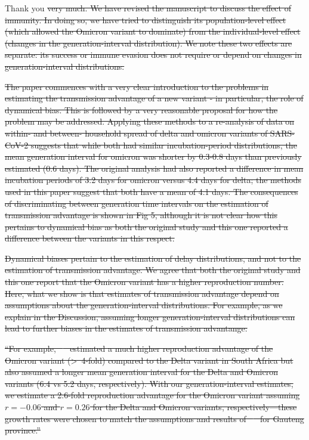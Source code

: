 \documentclass[12pt]{article}
\newcommand{\rev}{\subsection*}
\newcommand{\revtext}{\textsf}
\providecommand{\DIFdeltex}[1]{{\protect\color{red}\sout{#1}}}                      %
\providecommand{\DIFdelbegin}{} %
\providecommand{\DIFdel}[1]{\texorpdfstring{\DIFdeltex{#1}}{}} %
\begin{document}
Thank you \DIFdelbegin \DIFdel{very much. We have revised the manuscript to discuss the effect of immunity. In doing so, we have tried to distinguish its population-level effect (which allowed the Omicron variant to dominate) from the individual-level effect (changes in the generation-interval distribution).
We note these two effects are separate: its success or immune evasion does not require or depend on changes in generation-interval distributions.
}%


\DIFdel{\revtext{The paper commences with a very clear introduction to the problems in estimating the transmission advantage of a new variant - in particular, the role of dynamical bias. This is followed by a very reasonable proposal for how the problem may be addressed. Applying these methods to a re-analysis of data on within- and between- household spread of delta and omicron variants of SARS-CoV-2 suggests that while both had similar incubation-period distributions, the mean generation interval for omicron was shorter by 0.3-0.8 days than previously estimated (0.6 days). The original analysis had also reported a difference in mean incubation periods of 3.2 days for omicron versus 4.4 days for delta; the methods used in this paper suggest that both have a mean of 4.1 days. The consequences of discriminating between generation time intervals on the estimation of transmission advantage is shown in Fig 5, although it is not clear how this pertains to dynamical bias as both the original study and this one reported a difference between the variants in this respect.}
}%

\DIFdel{Dynamical biases pertain to the estimation of delay distributions, and not to the estimation of transmission advantage. 
We agree that both the original study and this one report that the Omicron variant has a higher reproduction number. 
Here, what we show is that estimates of transmission advantage depend on assumptions about the generation-interval distributions. 
For example, as we explain in the Discussion, assuming longer generation-interval distributions can lead to further biases in the estimates of transmission advantange:
}%

\DIFdel{``For example, \mbox{%
\cite{pearson2021bounding} }\hspace{0pt}%
estimated a much higher reproduction advantage of the Omicron variant (\textgreater\ 4-fold) compared to the Delta variant in South Africa but also assumed a longer mean generation interval for the Delta and Omicron variants (6.4 vs 5.2 days, respectively).
With our generation-interval estimates, we estimate a 2.6-fold reproduction advantage for the Omicron variant assuming $r=-0.06$ and $r=0.26$ for the Delta and Omicron variants, respectively---these growth rates were chosen to match the assumptions and results of \mbox{%
\cite{pearson2021bounding} }\hspace{0pt}%
for Gauteng province.''
}%
\end{document}
